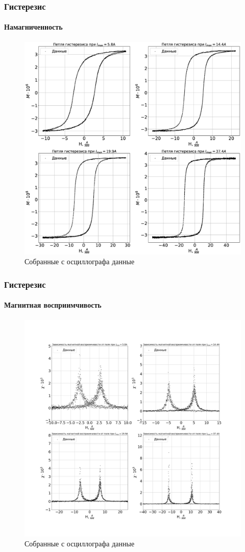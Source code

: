 \documentclass[8pt,pdf,hyperref={unicode}]{beamer}
\begin{document}
	\begin{frame}
		\frametitle{Гистерезис}
		\framesubtitle{Намагниченность}
		\begin{center}
			\begin{figure}[h!]
				\centering
				\includegraphics[width=.65\linewidth]{lab2_4.eps}
				\caption{Собранные с осциллографа данные}
				\label{fig:3}
			\end{figure}
		\end{center}
	\end{frame}
	
	\begin{frame}
		\frametitle{Гистерезис}
		\framesubtitle{Магнитная восприимчивость}
		\begin{center}
			\begin{figure}[h!]
				\centering
				\includegraphics[width=.65\linewidth]{Lab2_5.png}
				\caption{Собранные с осциллографа данные}
				\label{fig:3}
			\end{figure}
		\end{center}
	\end{frame}
\end{document}
